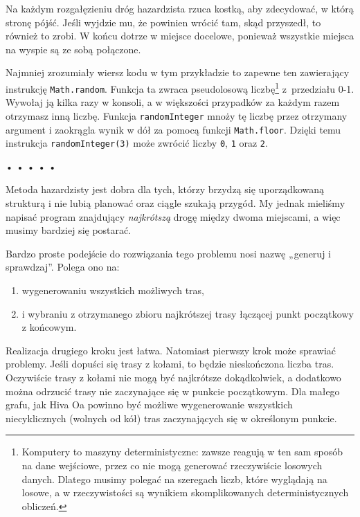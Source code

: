 Na każdym rozgałęzieniu dróg hazardzista rzuca kostką, aby zdecydować, w którą stronę pójść. Jeśli wyjdzie mu, że powinien wrócić tam, skąd przyszedł, to również to zrobi. W końcu dotrze w miejsce docelowe, ponieważ wszystkie miejsca na wyspie są ze sobą połączone.

  
Najmniej zrozumiały wiersz kodu w tym przykładzie to zapewne ten zawierający instrukcję \texttt{Math.random}. Funkcja ta zwraca pseudolosową liczbę\footnote{Komputery to maszyny deterministyczne: zawsze reagują w ten sam sposób na dane wejściowe, przez co nie mogą generować rzeczywiście losowych danych. Dlatego musimy polegać na szeregach liczb, które wyglądają na losowe, a w rzeczywistości są wynikiem skomplikowanych deterministycznych obliczeń.} z~przedziału 0-1. Wywołaj ją kilka razy w konsoli, a w większości przypadków za każdym razem otrzymasz inną liczbę. Funkcja \texttt{randomInteger} mnoży tę liczbę przez otrzymany argument i zaokrągla wynik w dół za pomocą funkcji \texttt{Math.floor}. Dzięki temu instrukcja \texttt{randomInteger(3)} może zwrócić liczby \texttt{0}, \texttt{1} oraz \texttt{2}.



\begin{center}
• • • • •
\end{center}

  
Metoda hazardzisty jest dobra dla tych, którzy brzydzą się uporządkowaną strukturą i nie lubią planować oraz ciągle szukają przygód. My jednak mieliśmy napisać program znajdujący \emph{najkrótszą} drogę między dwoma miejscami, a więc musimy bardziej się postarać.

  
Bardzo proste podejście do rozwiązania tego problemu nosi nazwę „generuj i sprawdzaj”. Polega ono na:

  \begin{enumerate}
    \item wygenerowaniu wszystkich możliwych tras,
    \item i wybraniu z otrzymanego zbioru najkrótszej trasy łączącej punkt początkowy z końcowym.
  \end{enumerate}
  
Realizacja drugiego kroku jest łatwa. Natomiast pierwszy krok może sprawiać problemy. Jeśli dopuści się trasy z kołami, to będzie nieskończona liczba tras. Oczywiście trasy z kołami nie mogą być najkrótsze dokądkolwiek, a dodatkowo można odrzucić trasy nie zaczynające się w punkcie początkowym. Dla małego grafu, jak Hiva Oa powinno być możliwe wygenerowanie wszystkich niecyklicznych (wolnych od kół) tras zaczynających się w określonym punkcie.



